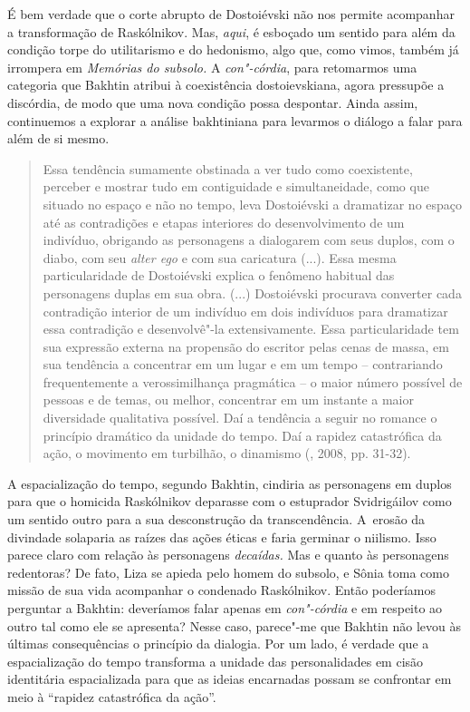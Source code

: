{{É bem verdade que o corte abrupto de Dostoiévski não nos permite
acompanhar a transformação de Raskólnikov. Mas, \emph{aqui}, é esboçado
um sentido para além da condição torpe do utilitarismo e do hedonismo,
algo que, como vimos, também já irrompera em \emph{Memórias do subsolo.}
A \emph{con"-córdia}, para retomarmos uma categoria que Bakhtin atribui à
coexistência dostoievskiana, agora pressupõe a discórdia, de modo que
uma nova condição possa despontar. Ainda assim, continuemos a explorar a
análise bakhtiniana para levarmos o diálogo a falar para além de si
mesmo.

\begin{quote}
Essa tendência sumamente obstinada a ver tudo como coexistente, perceber
e mostrar tudo em contiguidade e simultaneidade, como que situado no
espaço e não no tempo, leva Dostoiévski a dramatizar no espaço até as
contradições e etapas interiores do desenvolvimento de um indivíduo,
obrigando as personagens a dialogarem com seus duplos, com o diabo, com
seu \emph{alter ego} e com sua caricatura (...). Essa mesma
particularidade de Dostoiévski explica o fenômeno habitual das
personagens duplas em sua obra. (...) Dostoiévski procurava converter
cada contradição interior de um indivíduo em dois indivíduos para
dramatizar essa contradição e desenvolvê"-la extensivamente. Essa
particularidade tem sua expressão externa na propensão do escritor pelas
cenas de massa, em sua tendência a concentrar em um lugar e em um tempo
-- contrariando frequentemente a verossimilhança pragmática -- o maior
número possível de pessoas e de temas, ou melhor, concentrar em um
instante a maior diversidade qualitativa possível. Daí a tendência a
seguir no romance o princípio dramático da unidade do tempo. Daí a
rapidez catastrófica da ação, o movimento em turbilhão, o dinamismo
(, 2008, pp. 31-32).
\end{quote}

A espacialização do tempo, segundo Bakhtin, cindiria as personagens em
duplos para que o homicida Raskólnikov deparasse com o estuprador
Svidrigáilov como um sentido outro para a sua desconstrução da
transcendência. A~erosão da divindade solaparia as raízes das ações
éticas e faria germinar o niilismo. Isso parece claro com relação às
personagens \emph{decaídas.} Mas e quanto às personagens redentoras? De
fato, Liza se apieda pelo homem do subsolo, e Sônia toma como missão de
sua vida acompanhar o condenado Raskólnikov. Então poderíamos perguntar
a Bakhtin: deveríamos falar apenas em \emph{con"-córdia} e em respeito ao
outro tal como ele se apresenta? Nesse caso, parece"-me que Bakhtin não
levou às últimas consequências o princípio da dialogia. Por um lado, é
verdade que a espacialização do tempo transforma a unidade das
personalidades em cisão identitária espacializada para que as ideias
encarnadas possam se confrontar em meio à ``rapidez catastrófica da
ação''.

}}
